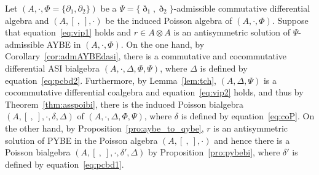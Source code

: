 \documentclass[pdftex]{sigma}
\numberwithin{equation}{section}
\begin{document}
Let $(A, \cdot, \Phi = \{\partial_1, \partial_2\})$ be a $\Psi = \{\eth_1, \eth_2\}$-admissible commutative differential algebra and $(A, [\ ,\ ], \cdot)$ be the induced Poisson algebra of $(A, \cdot, \Phi)$.
Suppose that equation~\eqref{eq:vip1} holds and $r \in A \otimes A$ is an antisymmetric solution of $\Psi$-admissible AYBE in $(A, \cdot, \Phi)$.
On the one hand, by Corollary~\ref{cor:admAYBEdasi}, there is a commutative and cocommutative differential ASI bialgebra $(A, \cdot, \Delta, \Phi, \Psi)$, where $\Delta$ is defined by equation~\eqref{eq:pcbd2}.
Furthermore, by Lemma~\ref{lem:tch}, $(A, \Delta, \Psi)$ is a cocommutative differential coalgebra and equation~\eqref{eq:vip2} holds, and thus by Theorem~\ref{thm:asspoibi},
there is the induced Poisson bialgebra $(A,[\ ,\ ], \cdot, \delta, \Delta)$ of $(A, \cdot, \Delta, \Phi, \Psi)$,
where $\delta$ is defined by equation~\eqref{eq:coP}.
On the other hand, by Proposition~\ref{pro:aybe_to_qybe}, $r$ is an antisymmetric solution of PYBE in the Poisson algebra $(A, [\ ,\ ], \cdot)$
and hence there is a Poisson bialgebra $(A,[\ ,\ ], \cdot, \delta', \Delta)$ by Proposition~\ref{pro:pybebi},
where $\delta'$ is defined by equation~\eqref{eq:pcbd1}.
\end{document}
